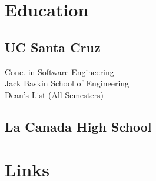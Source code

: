 \documentclass[letterpaper]{deedy-resume} %
\begin{document}




\begin{minipage}[t]{0.33\textwidth} %


\section{Education} 

\subsection{UC Santa Cruz }

Conc. in Software Engineering \\
Jack Baskin School of Engineering \\
Dean's List (All Semesters) \\

\sectionspace %


\subsection{La Canada High School}


\sectionspace %


\section{Links} 


\end{minipage}
\end{document}
